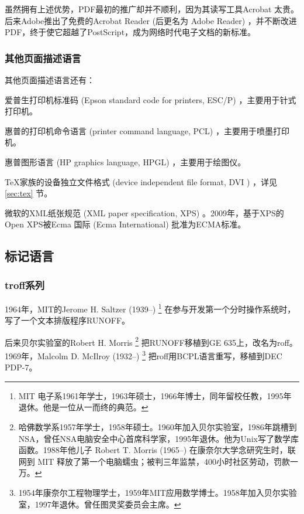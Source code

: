 虽然拥有上述优势，PDF最初的推广却并不顺利，因为其读写工具Acrobat 太贵。后来Adobe推出了免费的Acrobat Reader (后更名为 Adobe Reader) ，并不断改进PDF，终于使它超越了PostScript，成为网络时代电子文档的新标准。

\subsubsection{其他页面描述语言}

其他页面描述语言还有：
\begin{compactitem}
   \item 爱普生打印机标准码 (Epson standard code for printers, ESC/P) ，主要用于针式打印机。
   \item 惠普\indexHP 的打印机命令语言 (printer command language, PCL) ，主要用于喷墨打印机。
   \item 惠普图形语言 (HP graphics language, HPGL) ，主要用于绘图仪。
   \item \TeX 家族的设备独立文件格式 (device independent file format,  DVI ) ，详见 \ref{sec:tex} 节。
   \item 微软\indexMSFT 的XML纸张规范 (XML paper specification, XPS) 。2009年，基于XPS的Open XPS被Ecma 国际 (Ecma International)\indexECMA{} 批准为ECMA标准。
\end{compactitem}

\subsection{标记语言}

\subsubsection{troff系列}

1964年，MIT的Jerome H. Saltzer (1939--)\indexSaltzer{} \footnote{MIT 电子系1961年学士，1963年硕士，1966年博士，同年留校任教，1995年退休。他是一位从一而终的典范。} 在参与开发第一个分时操作系统时，写了一个文本排版程序RUNOFF。

后来贝尔实验室\indexBell 的Robert H. Morris\indexMorris{} \footnote{哈佛数学系1957年学士，1958年硕士。1960年加入贝尔实验室，1986年跳槽到NSA，曾任NSA电脑安全中心首席科学家，1995年退休。他为Unix写了数学库函数。1988年他儿子 Robert T. Morris (1965--) 在康奈尔大学念研究生时，联网到 MIT 释放了第一个电脑蠕虫；被判三年监禁，400小时社区劳动，罚款一万。} 把RUNOFF移植到GE 635上，改名为roff。1969年，Malcolm D. McIlroy (1932--)\indexMcIlroy{} \footnote{1954年康奈尔工程物理学士，1959年MIT应用数学博士。1958年加入贝尔实验室，1997年退休。曾任图灵奖委员会主席。} 把roff用BCPL语言重写，移植到DEC\indexDEC{} PDP-7。

